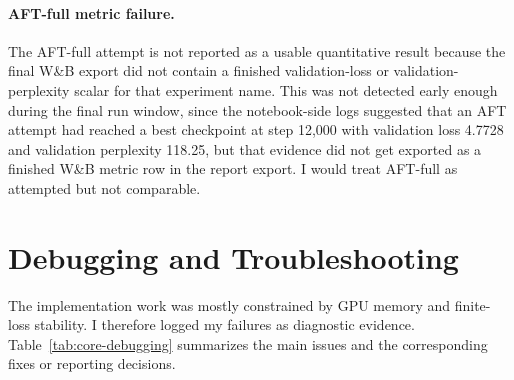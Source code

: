 \documentclass[11pt]{article}
\begin{document}
\paragraph{AFT-full metric failure.}
The AFT-full attempt is not reported as a usable quantitative result because the final W\&B export did not contain a finished validation-loss or validation-perplexity scalar for that experiment name. This was not detected early enough during the final run window, since the notebook-side logs suggested that an AFT attempt had reached a best checkpoint at step 12,000 with validation loss 4.7728 and validation perplexity 118.25, but that evidence did not get exported as a finished W\&B metric row in the report export. I would treat AFT-full as attempted but not comparable.

\section{Debugging and Troubleshooting}
The implementation work was mostly constrained by GPU memory and finite-loss stability. I therefore logged my failures as diagnostic evidence. Table~\ref{tab:core-debugging} summarizes the main issues and the corresponding fixes or reporting decisions.
\end{document}
